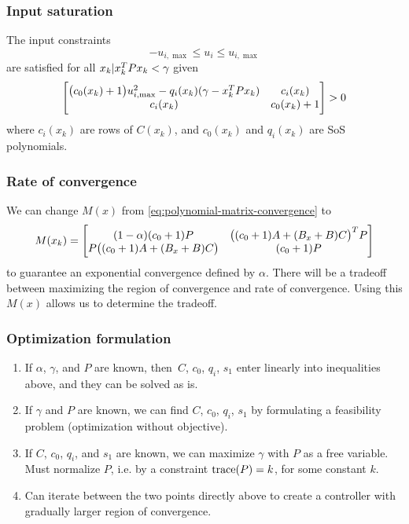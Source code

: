 \subsubsection{Input saturation}
The input constraints
%
\begin{equation}
  -u_{i,\max} \leq u_i \leq u_{i,\max}
\end{equation}
%
are satisfied for all $x_k | x_k^{T} P x_k < \gamma$ given
\begin{equation}
  \begin{bmatrix}
    \big( c_0(x_k) + 1 \big)u_{i,\max}^2 - q_i(x_k)(\gamma - x_k^{T} P x_k) & c_i(x_k) \\
    c_i(x_k) & c_0(x_k) + 1
  \end{bmatrix}
  > 0
\end{equation}
%
where
%
$c_i(x_k)$ are rows of $C(x_k)$, and $c_0(x_k)$ and $q_i(x_k)$ are SoS polynomials.

\subsubsection{Rate of convergence}
We can change $M(x)$ from \eqref{eq:polynomial-matrix-convergence} to
\begin{equation}
  M(x_k) =
  \begin{bmatrix}
    (1 - \alpha)(c_0 + 1) P & \big( (c_0 + 1)A + (B_x + B)C \big)^{T} P \\
    P \big( (c_0 + 1)A + (B_x + B)C \big) & (c_0 + 1)P
  \end{bmatrix}
\end{equation}
to guarantee an exponential convergence defined by $\alpha$. There will be a tradeoff between maximizing the region of convergence and rate of convergence. Using this $M(x)$ allows us to determine the tradeoff.

\subsubsection{Optimization formulation}
\begin{enumerate}
  \item If $\alpha$, $\gamma$, and $P$ are known, then $C$, $c_0$, $q_i$, $s_1$ enter linearly into inequalities above, and they can be solved as is.
  \item If $\gamma$ and $P$ are known, we can find $C$, $c_0$, $q_i$, $s_1$ by formulating a feasibility problem (optimization without objective).
  \item If $C$, $c_0$, $q_i$, and $s_1$ are known, we can maximize $\gamma$ with $P$ as a free variable. Must normalize $P$, i.e. by a constraint $\operatorname{trace}(P) = k$, for some constant $k$.
  \item Can iterate between the two points directly above to create a controller with gradually larger region of convergence.
\end{enumerate}
